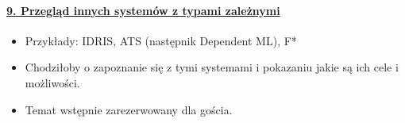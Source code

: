 \documentclass[10pt, a4paper]{article}
\begin{document}
\paragraph{\underline{9. Przegląd innych systemów z typami zależnymi}}

\begin{itemize}
\addtolength{\itemsep}{-0.5\baselineskip}
 \item Przykłady: IDRIS, ATS (następnik Dependent ML), F*
 \item Chodziłoby o zapoznanie się z tymi systemami i pokazaniu jakie są ich cele i możliwości.
 \item Temat wstępnie zarezerwowany dla gościa.
\end{itemize}
\end{document}
